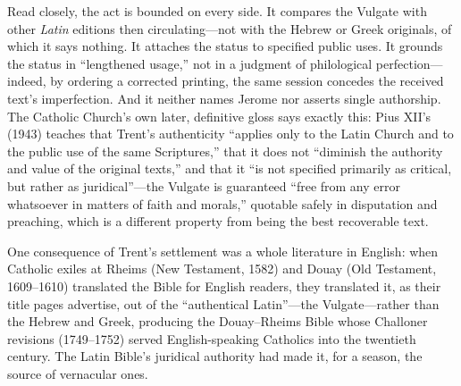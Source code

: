 Read closely, the act is bounded on every side. It compares the Vulgate
with other \emph{Latin} editions then circulating---not with the Hebrew
or Greek originals, of which it says nothing. It attaches the status to
specified public uses. It grounds the status in ``lengthened usage,'' not
in a judgment of philological perfection---indeed, by ordering a corrected
printing, the same session concedes the received text's imperfection. And
it neither names Jerome nor asserts single authorship. The Catholic
Church's own later, definitive gloss says exactly this: Pius XII's
 (1943) teaches that Trent's authenticity
``applies only to the Latin Church and to the public use of the same
Scriptures,'' that it does not ``diminish the authority and value of the
original texts,'' and that it ``is not specified primarily as critical,
but rather as juridical''---the Vulgate is guaranteed ``free from any
error whatsoever in matters of faith and morals,'' quotable safely in
disputation and preaching, which is a different property from being the
best recoverable text.

One consequence of Trent's settlement was a whole literature in English:
when Catholic exiles at Rheims (New Testament, 1582) and Douay (Old
Testament, 1609--1610) translated the Bible for English readers, they
translated it, as their title pages advertise, out of the ``authentical
Latin''---the Vulgate---rather than the Hebrew and Greek, producing the
Douay--Rheims Bible whose Challoner revisions (1749--1752) served
English-speaking Catholics into the twentieth century. The Latin Bible's
juridical authority had made it, for a season, the source of vernacular
ones.
